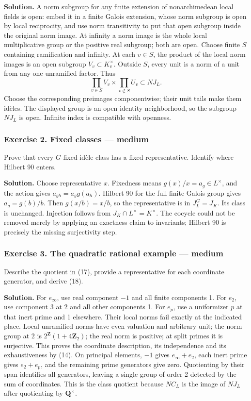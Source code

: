 \documentclass[11pt,a4paper]{article}
\begin{document}
\textbf{Solution.} A norm subgroup for any finite extension of
nonarchimedean local fields is open: embed it in a finite Galois
extension, whose norm subgroup is open by local reciprocity, and use
norm transitivity to put that open subgroup inside the original norm
image. At infinity a norm image is the whole local multiplicative group
or the positive real subgroup; both are open. Choose finite \(S\)
containing ramification and infinity. At each \(v\in S\), the product of
the local norm images is an open subgroup \(V_v\subset K_v^\times\).
Outside \(S\), every unit is a norm of a unit from any one unramified
factor. Thus \[
\prod_{v\in S}V_v\times\prod_{v\notin S}U_v
\subset N J_L.
\] Choose the corresponding preimages componentwise; their unit tails
make them idèles. The displayed group is an open identity neighborhood,
so the subgroup \(N J_L\) is open. Infinite index is compatible with
openness.

\subsubsection{Exercise 2. Fixed classes ---
medium}\label{exercise-2.-fixed-classes-medium}

Prove that every \(G\)-fixed idèle class has a fixed representative.
Identify where Hilbert 90 enters.

\textbf{Solution.} Choose representative \(x\). Fixedness means
\(g(x)/x=a_g\in L^\times\), and the action gives \(a_{gh}=a_g g(a_h)\).
Hilbert 90 for the full finite Galois group gives \(a_g=g(b)/b\). Then
\(g(x/b)=x/b\), so the representative is in \(J_L^G=J_K\). Its class is
unchanged. Injection follows from \(J_K\cap L^\times=K^\times\). The
cocycle could not be removed merely by applying an exactness claim to
invariants; Hilbert 90 is precisely the missing surjectivity step.

\subsubsection{Exercise 3. The quadratic rational example ---
medium}\label{exercise-3.-the-quadratic-rational-example-medium}

Describe the quotient in (17), provide a representative for each
coordinate generator, and derive (18).

\textbf{Solution.} For \(e_\infty\), use real component \(-1\) and all
finite components 1. For \(e_2\), use component 3 at 2 and all other
components 1. For \(e_p\), use a uniformizer \(p\) at that inert prime
and 1 elsewhere. Their local norms fail exactly at the indicated place.
Local unramified norms have even valuation and arbitrary unit; the norm
group at 2 is \(2^{\mathbf Z}(1+4\mathbf Z_2)\); the real norm is
positive; at split primes it is surjective. This proves the coordinate
description, its independence and its exhaustiveness by (14). On
principal elements, \(-1\) gives \(e_\infty+e_2\), each inert prime
gives \(e_2+e_p\), and the remaining prime generators give zero.
Quotienting by their span identifies all generators, leaving a single
group of order 2 detected by the sum of coordinates. This is the class
quotient because \(N C_L\) is the image of \(N J_L\) after quotienting
by \(\mathbf Q^\times\).
\end{document}
